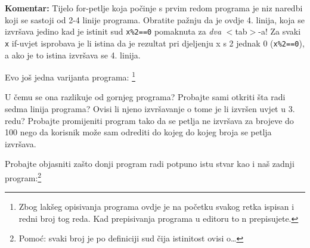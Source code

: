 \textbf{Komentar:} Tijelo for-petlje koja po\v{c}inje s prvim redom
programa je niz naredbi koji se sastoji od 2-4 linije programa.
Obratite pa\v{z}nju da je ovdje 4. linija, koja se izvr\v{s}ava jedino
kad je istinit sud \verb"x%2==0" pomaknuta za \emph{dva} $<$tab$>$-a!
Za svaki \verb"x" if-uvjet isprobava je li istina da je rezultat
pri djeljenju x s 2 jednak 0 (\verb"x%2==0"), a ako je to istina
izvr\v{s}ava se 4. linija.

Evo jo\v{s} jedna varijanta programa:
\footnote{
Zbog lak\v{s}eg opisivanja programa ovdje je na po\v{c}etku svakog retka
ispisan i redni broj tog reda. Kad prepisivanja programa u editoru to n
prepisujete.
}


U \v{c}emu se ona razlikuje od gornjeg programa? Probajte sami otkriti \v{s}ta
radi sedma linija programa? Ovisi li njeno izvr\v{s}avanje o tome je li
izvr\v{s}en uvjet u 3. redu? Probajte promijeniti program tako da se petlja ne
izvr\v{s}ava za brojeve do 100 nego da korisnik mo\v{z}e sam odrediti do kojeg do
kojeg broja se petlja izvr\v{s}ava.

Probajte objasniti za\v{s}to donji program radi potpuno istu stvar
kao i na\v{s} zadnji program:\footnote{Pomo\'{c}: svaki broj je po definiciji sud
\v{c}ija istinitost ovisi o\dots}


